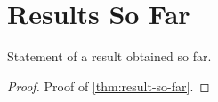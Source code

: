 \chapter{Results So Far}
\label{ch:results-so-far}

\begin{theorem}
\label{thm:result-so-far}
Statement of a result obtained so far.
\end{theorem}

\begin{proof}
Proof of \cref{thm:result-so-far}.
\end{proof}
